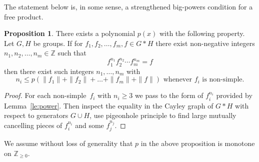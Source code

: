 \documentclass[10pt]{amsart}
\theoremstyle{definition}
\newtheorem{proposition}[theorem]{Proposition}
\def\nondumb{non-simple} %
\begin{document}
The statement below is, in some sense, a strengthened big-powers condition for a free product.
\begin{proposition}\label{pr:big_power}
There exists a polynomial $p(x)$ with the following property. Let $G,H$ be groups. If for $f_1,f_2,\ldots, f_m, f\in G*H$ there exist non-negative integers $n_1,n_2,\ldots,n_m\in\mathbb Z$ such that
$$
f_1^{n_1}f_2^{n_2}\cdots f_m^{n_m}=f
$$
then there exist such integers $n_1,\ldots,n_m$ with
$$n_i\le p(\|f_1\|+\|f_2\|+\ldots+\|f_m\|+\|f\|)\mbox{ whenever } f_i\mbox{ is \nondumb}.
$$
\end{proposition}
\begin{proof}
For each \nondumb\ $f_i$ with $n_i\ge 3$ we pass to the form of $f_i^{n_i}$ provided by Lemma~\ref{le:power}. Then inspect the equality in the Cayley graph of $G*H$ with respect to generators $G\cup H$, use pigeonhole principle to find large mutually cancelling pieces of $f_i^{n_i}$ and some $f_j^{n_j}$.
\end{proof}
We assume without loss of generality that $p$ in the above proposition is monotone on $\mathbb{Z}_{\ge 0}$.
\end{document}

